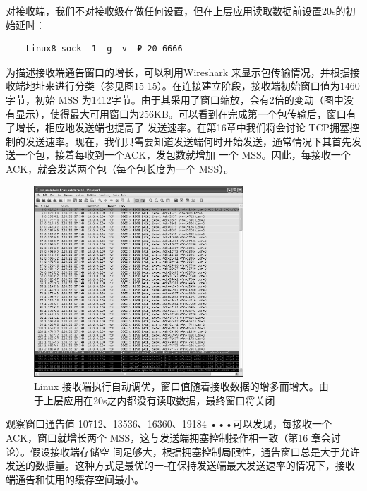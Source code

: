 对接收端，我们不对接收级存做任何设置，但在上层应用读取数据前设置20s的初始延时：
\begin{verbatim}
    Linux8 sock -1 -g -v -₽ 20 6666
\end{verbatim}

为描述接收端通告窗口的增长，可以利用Wireshark 来显示包传输情况，并根据接收端地址来进行分类（参见图15-15）。在连接建立阶段，接收端初始窗口值为1460字节，初始
MSS 为1412字节。由于其采用了窗口缩放，会有2倍的变动（图中没有显示），使得最大可用窗口为256KB。可以看到在完成第一个包传输后，窗口有了增长，相应地发送端也提高了
发送速率。在第16章中我们将会讨论 TCP拥塞控制的发送速率。现在，我们只需要知道发送端何时开始发送，通常情况下其首先发送一个包，接着每收到一个ACK，发包数就增加
一个 MSS。因此，每接收一个 ACK，就会发送两个包（每个包长度为一个 MSS）。
\begin{figure}[!htb]
    \centering
	\includegraphics[width=0.7\textwidth]{imgs/15/15-15.png}
	\caption{Linux 接收端执行自动调优，窗口值随着接收数据的增多而增大。由于上层应用在20s之内都没有读取数据，最终窗口将关闭}
\end{figure}

观察窗口通告值 10712、13536、16360、19184 •••可以发现，每接收一个ACK，窗口就增长两个 MSS，这与发送端拥塞控制操作相一致（第16 章会讨论）。假设接收端存储空
间足够大，根据拥塞控制局限性，通告窗口总是大于允许发送的数据量。这种方式是最优的一-在保持发送端最大发送速率的情况下，接收端通告和使用的缓存空间最小。

